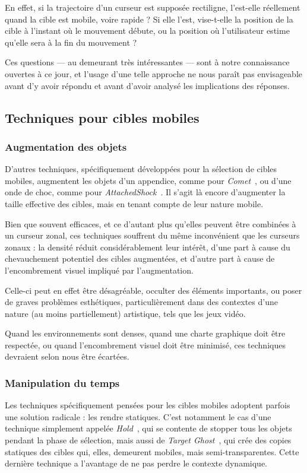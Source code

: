     En effet, si la trajectoire d'un curseur est supposée rectiligne, l'est-elle réellement quand la cible est mobile, voire rapide ? Si elle l'est, vise-t-elle la position de la cible à l'instant où le mouvement débute, ou la position où l'utilisateur estime qu'elle sera à la fin du mouvement ?
    
    Ces questions --- au demeurant très intéressantes --- sont à notre connaissance ouvertes à ce jour, et l'usage d'une telle approche ne nous paraît pas envisageable avant d'y avoir répondu et avant d'avoir analysé les implications des réponses.

    \subsection{Techniques pour cibles mobiles}
	\subsubsection{Augmentation des objets}
    D'autres techniques, spécifiquement développées pour la sélection de cibles mobiles, augmentent les objets d'un appendice, comme pour \emph{Comet}~\cite{hasan2011comet}, ou d'une onde de choc, comme pour \emph{AttachedShock}~\cite{you2012attachedshock, you2014attachedshock}. Il s'agit là encore d'augmenter la taille effective des cibles, mais en tenant compte de leur nature mobile.
    
    Bien que souvent efficaces, et ce d'autant plus qu'elles peuvent être combinées à un curseur zonal, ces techniques souffrent du même inconvénient que les curseurs zonaux : la densité réduit considérablement leur intérêt, d'une part à cause du chevauchement potentiel des cibles augmentées, et d'autre part à cause de l'encombrement visuel impliqué par l'augmentation.
    
    Celle-ci peut en effet être désagréable, occulter des éléments importants, ou poser de graves problèmes esthétiques, particulièrement dans des contextes d'une nature (au moins partiellement) artistique, tels que les jeux vidéo.
    
    Quand les environnements sont denses, quand une charte graphique doit être respectée, ou quand l'encombrement visuel doit être minimisé, ces techniques devraient selon nous être écartées.
    
	\subsubsection{Manipulation du temps}
    Les techniques spécifiquement pensées pour les cibles mobiles adoptent parfois une solution radicale : les rendre statiques. C'est notamment le cas d'une technique simplement appelée \emph{Hold}~\cite{hajri2011moving}, qui se contente de stopper tous les objets pendant la phase de sélection, mais aussi de \emph{Target Ghost}~\cite{hasan2011comet}, qui crée des copies statiques des cibles qui, elles, demeurent mobiles, mais semi-transparentes. Cette dernière technique a l'avantage de ne pas perdre le contexte dynamique.
    
